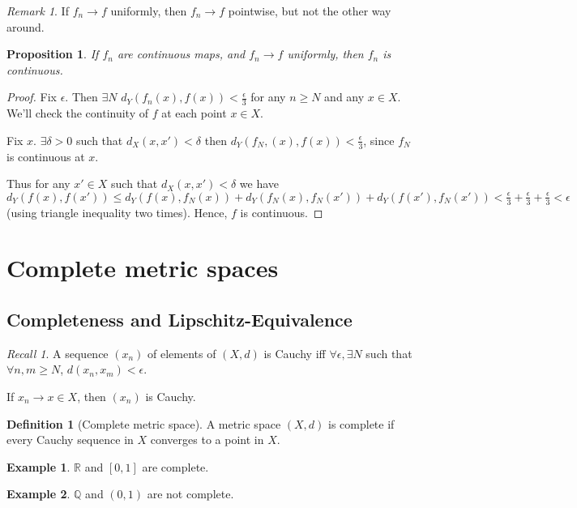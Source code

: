 \documentclass{article}
\theoremstyle{definition}
\newtheorem{defn}{Definition}[section]
\newtheorem{exmp}{Example}[section]
\theoremstyle{plain}%
\newtheorem{prop}[thm]{Proposition}
\theoremstyle{remark}
\newtheorem*{rem}{Remark}
\newtheorem*{rec}{Recall}
\newcommand{\R}{\mathbb{R}}
\newcommand{\Q}{\mathbb{Q}}
\begin{document}
\begin{rem}
    If $f_n \to f$ uniformly, then $f_n \to f$ pointwise, but not the other way around.
\end{rem}

\begin{prop}
    If $f_n$ are continuous maps, and $f_n \to f$ uniformly, then $f_n$ is continuous. 
\end{prop}

\begin{proof}
     Fix $\epsilon$. Then $\exists N$ $d_Y(f_n(x), f(x)) < \frac{\epsilon}{3}$ for any $n \ge N$ and any $x \in X$. We'll check the continuity of $f$ at each point $x \in X$.
    
    Fix $x$. $\exists \delta > 0$ such that $d_X(x, x') < \delta$ then $d_Y(f_N,(x), f(x)) < \frac{\epsilon}{3}$, since $f_N$ is continuous at $x$.
    
    Thus for any $x' \in X$ such that $d_X(x, x') < \delta$ we have $d_Y(f(x), f(x')) \le d_Y(f(x), f_N(x)) + d_Y(f_N(x), f_N(x')) + d_Y(f(x'), f_N(x')) < \frac{\epsilon}{3} + \frac{\epsilon}{3} + \frac{\epsilon}{3} < \epsilon$ (using triangle inequality two times). Hence, $f$ is continuous. 
\end{proof}

\section{Complete metric spaces}

\subsection{Completeness and Lipschitz-Equivalence}

\begin{rec}
    A sequence $(x_n)$ of elements of $(X,d)$ is Cauchy iff $\forall \epsilon, \exists N$ such that $\forall n,m \ge N$, $d(x_n, x_m) < \epsilon$.
    
    If $x_n \to x \in X$, then $(x_n)$ is Cauchy.
\end{rec}

\begin{defn}[Complete metric space]
    A metric space $(X, d)$ is complete if every Cauchy sequence in $X$ converges to a point in $X$.
\end{defn}

\begin{exmp}
    $\R$ and $[0,1]$ are complete.
\end{exmp}
\begin{exmp}
    $\Q$ and $(0,1)$ are not complete.
\end{exmp}
\end{document}
